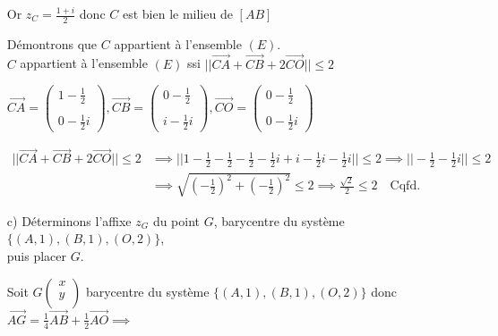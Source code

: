 \documentclass[12pt]{article}
\begin{document}
\begin{itemize}
Or \( z_C = \frac{1+i}{2} \) donc \( C \) est bien le milieu de \( [AB] \)

Démontrons que \( C \) appartient à l'ensemble \( (E) \). \\

\( C \) appartient à l'ensemble \( (E) \) ssi 
$
||\overrightarrow{CA} + \overrightarrow{CB} + 2\overrightarrow{CO}|| \leq 2
$

$
\overrightarrow{CA}=\begin{pmatrix}1-\frac{1}{2} \\ \\ 0-\frac{1}{2}i\end{pmatrix},
\overrightarrow{CB}=\begin{pmatrix}0-\frac{1}{2} \\ \\ i-\frac{1}{2}i\end{pmatrix},
\overrightarrow{CO}=\begin{pmatrix}0-\frac{1}{2} \\ \\ 0-\frac{1}{2}i\end{pmatrix}
$

\begin{align*}
||\overrightarrow{CA} + \overrightarrow{CB} + 2\overrightarrow{CO}|| \leq 2 &\implies
||1-\frac{1}{2}-\frac{1}{2}-\frac{1}{2}-\frac{1}{2}i+i-\frac{1}{2}i-\frac{1}{2}i|| \leq 2\implies
||-\frac{1}{2}-\frac{1}{2}i|| \leq 2 \\
&\implies \sqrt{\left( -\frac{1}{2} \right)^{2}+\left( -\frac{1}{2} \right)^{2} } \leq 2\implies
\frac{\sqrt{2}}{2}\leq 2\quad \text{Cqfd.}
\end{align*}

\item[c)] Déterminons l'affixe \( z_{G} \) du point \( G \), barycentre du système \( \{(A,1), (B,1), (O,2)\} \),\\ puis placer \( G \).


Soit \(G\begin{pmatrix}x \\y \\ \end{pmatrix} \) barycentre du système \( \{(A,1), (B,1), (O,2)\} \) donc
\( \overrightarrow{AG}=\frac{1}{4}\overrightarrow{AB}+\frac{1}{2}\overrightarrow{AO}\implies  \)


\end{itemize}
\end{document}
